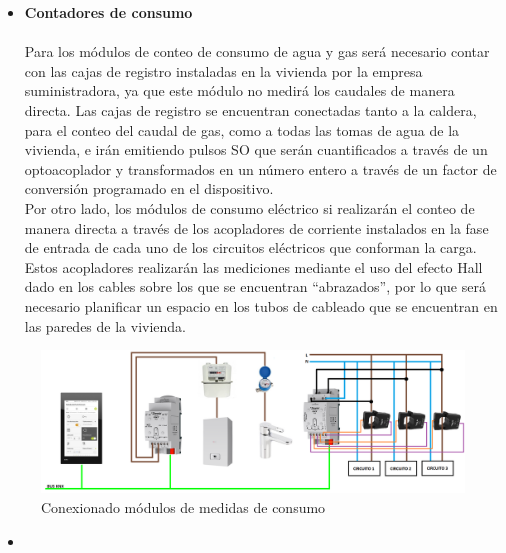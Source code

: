 \begin{itemize}
\item \textbf{Contadores de consumo} \\ \\
Para los módulos de conteo de consumo de agua y gas será necesario contar con las cajas de registro instaladas en la vivienda por la empresa suministradora, ya que este módulo no medirá los caudales de manera directa. Las cajas de registro se encuentran conectadas tanto a la caldera, para el conteo del caudal de gas, como a todas las tomas de agua de la vivienda, e irán emitiendo pulsos SO que serán  cuantificados a través de un optoacoplador y transformados en un número entero a través de un factor de conversión programado en el dispositivo. \\
Por otro lado, los módulos de consumo eléctrico si realizarán el conteo de manera directa a través de los acopladores de corriente instalados en la fase de entrada de cada uno de los circuitos eléctricos que conforman la carga. Estos acopladores realizarán las mediciones mediante el uso del efecto Hall dado en los cables sobre los que se encuentran “abrazados”, por lo que será necesario planificar un espacio en los tubos de cableado que se encuentran en las paredes de la vivienda.
\end{itemize}
\begin{flushleft}
\begin{figure}[h]
\includegraphics[width=1.15\textwidth]{figures/conex_consumo.png}   
\caption{Conexionado módulos de medidas de consumo}
\label{fig:conex_consumo}
\end{figure}
\end{flushleft}

\begin{itemize}
\item \textbf{} \\ \\
\end{itemize} 